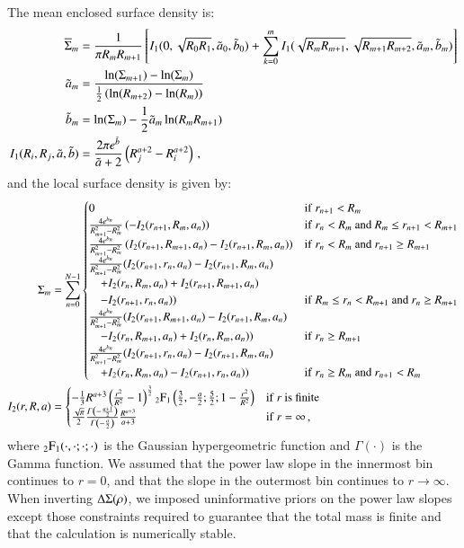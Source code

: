 \documentclass{aa}
\renewcommand{\Upsigma}{{\rm \Sigma}}
\renewcommand{\Updelta}{{\rm \Delta}}
\begin{document}
The mean enclosed surface density is:
\begin{align}
\overline{\Upsigma}_m &= \frac{1}{\pi R_mR_{m+1}}\left[I_1(0, \sqrt{R_0R_1}, \tilde{a}_0, \tilde{b}_0) + 
\sum_{k=0}^m I_1(\sqrt{R_mR_{m+1}},\sqrt{R_{m+1}R_{m+2}}, \tilde{a}_m, \tilde{b}_m)\right]\\
\tilde{a}_m &= \frac{\ln(\Upsigma_{m+1})-\ln(\Upsigma_m)}{\frac{1}{2}\left(\ln(R_{m+2})-\ln(R_m)\right)}\\
\tilde{b}_m &= \ln(\Upsigma_m) - \frac{1}{2}\tilde{a}_m\ln(R_mR_{m+1})\\
I_1(R_i,R_j,\tilde{a},\tilde{b}) &= \frac{2\pi e^{\tilde{b}}}{\tilde{a}+2}\left(R_j^{a+2} - R_i^{a+2}\right) \, ,
\end{align}
\noindent and the local surface density is given by:
\begin{align}
\Upsigma_m &= \sum_{n=0}^{N-1}
\begin{cases}
0 & {\rm if}\ r_{n+1} < R_m\\
\frac{4e^{b_n}}{R_{m+1}^2-R_m^2} \left(-I_2(r_{n+1},R_m,a_n)\right) & {\rm if}\ r_n < R_m\ {\rm and}\ R_m \leq r_{n+1} < R_{m+1}\\
\frac{4e^{b_n}}{R_{m+1}^2-R_m^2} \left(I_2(r_{n+1},R_{m+1},a_n)-I_2(r_{n+1},R_m,a_n)\right) & {\rm if}\ r_n < R_m\ {\rm and}\ r_{n+1} \geq R_{m+1}\\
\frac{4e^{b_n}}{R_{m+1}^2-R_m^2} (I_2(r_{n+1},r_n,a_n)-I_2(r_{n+1},R_m,a_n)\\ \quad +I_2(r_n,R_m,a_n)+I_2(r_{n+1},R_{m+1},a_n)\\ \quad -I_2(r_{n+1},r_n,a_n)) & {\rm if}\ R_m \leq r_n < R_{m+1}\ {\rm and}\ r_n \geq R_{m+1}\\
\frac{4e^{b_n}}{R_{m+1}^2-R_m^2} (I_2(r_{n+1},R_{m+1},a_n)-I_2(r_{n+1},R_m,a_n)\\ \quad -I_2(r_n,R_{m+1},a_n)+I_2(r_n,R_m,a_n)) & {\rm if}\ r_n \geq R_{m+1}\\
\frac{4e^{b_n}}{R_{m+1}^2-R_m^2} (I_2(r_{n+1},r_n,a_n)-I_2(r_{n+1},R_m,a_n)\\ \quad +I_2(r_n,R_m,a_n)-I_2(r_{n+1},r_n,a_n)) & {\rm if}\ r_n \geq R_m\ {\rm and}\ r_{n+1} < R_m\\
\end{cases}\\
I_2(r,R,a) &=
\begin{cases}
-\frac{1}{3}R^{a+3}\left(\frac{r^2}{R^2}-1\right)^{\frac{3}{2}}{}_2{\rm F}_1\left(\frac{3}{2},-\frac{a}{2};\frac{5}{2};1-\frac{r^2}{R^2}\right) & {\rm if}\ r\ {\rm is}\ {\rm finite}\\
\frac{\sqrt{\pi}}{2}\frac{\Gamma\left(-\frac{a+1}{2}\right)}{\Gamma\left(-\frac{a}{2}\right)}\frac{R^{a+3}}{a+3} & {\rm if}\ r=\infty \, ,
\end{cases}
\end{align}
where ${}_2{\rm F}_1(\cdot,\cdot;\cdot;\cdot)$ is the Gaussian hypergeometric function and $\Gamma(\cdot)$ is the Gamma function. We assumed that the power law slope in the innermost bin continues to $r=0$, and that the slope in the outermost bin continues to $r\rightarrow\infty$. When inverting $\Updelta\Upsigma(\rho)$, we imposed uninformative priors on the power law slopes except those constraints required to guarantee that the total mass is finite and that the calculation is numerically stable.
\end{document}
